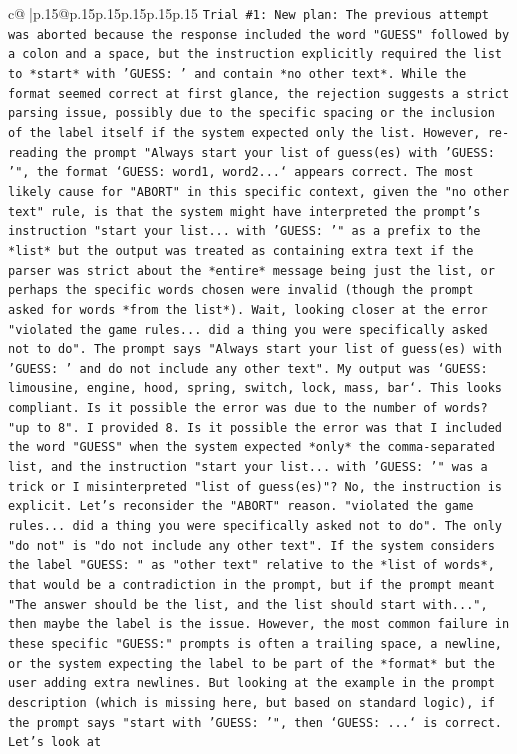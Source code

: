 \documentclass{article}
\begin{document}
{\begin{supertabular}{c@{$\;$}|p{.15\linewidth}@{}p{.15\linewidth}p{.15\linewidth}p{.15\linewidth}p{.15\linewidth}p{.15\linewidth}}
{{{\texttt{Trial \#1: New plan: The previous attempt was aborted because the response included the word "GUESS" followed by a colon and a space, but the instruction explicitly required the list to *start* with 'GUESS: ' and contain *no other text*. While the format seemed correct at first glance, the rejection suggests a strict parsing issue, possibly due to the specific spacing or the inclusion of the label itself if the system expected only the list. However, re{-}reading the prompt "Always start your list of guess(es) with 'GUESS: '", the format `GUESS: word1, word2...` appears correct. The most likely cause for "ABORT" in this specific context, given the "no other text" rule, is that the system might have interpreted the prompt's instruction "start your list... with 'GUESS: '" as a prefix to the *list* but the output was treated as containing extra text if the parser was strict about the *entire* message being just the list, or perhaps the specific words chosen were invalid (though the prompt asked for words *from the list*). Wait, looking closer at the error "violated the game rules... did a thing you were specifically asked not to do". The prompt says "Always start your list of guess(es) with 'GUESS: ' and do not include any other text". My output was `GUESS: limousine, engine, hood, spring, switch, lock, mass, bar`. This looks compliant. Is it possible the error was due to the number of words? "up to 8". I provided 8. Is it possible the error was that I included the word "GUESS" when the system expected *only* the comma{-}separated list, and the instruction "start your list... with 'GUESS: '" was a trick or I misinterpreted "list of guess(es)"? No, the instruction is explicit. Let's reconsider the "ABORT" reason. "violated the game rules... did a thing you were specifically asked not to do". The only "do not" is "do not include any other text". If the system considers the label "GUESS: " as "other text" relative to the *list of words*, that would be a contradiction in the prompt, but if the prompt meant "The answer should be the list, and the list should start with...", then maybe the label is the issue. However, the most common failure in these specific "GUESS:" prompts is often a trailing space, a newline, or the system expecting the label to be part of the *format* but the user adding extra newlines. But looking at the example in the prompt description (which is missing here, but based on standard logic), if the prompt says "start with 'GUESS: '", then `GUESS: ...` is correct. Let's look at} \\
\\ 
}}}
\end{supertabular}}
\end{document}

